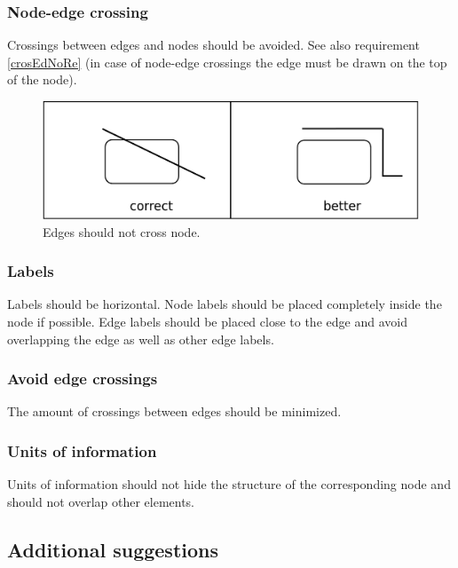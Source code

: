 \subsubsection{Node-edge crossing}\label{crosEdNo}

Crossings between edges and nodes should be avoided. See also requirement \ref{crosEdNoRe} (in case of node-edge crossings the edge must be drawn on the top of the node).

\begin{figure}[!htb]
  \centering
  \includegraphics[scale=0.3]{images/layout-node-edge-2}
  \caption{Edges should not cross node.}\label{fig:layout7}
\end{figure}


\subsubsection{Labels}

Labels should be horizontal. Node labels should be placed completely inside the node if possible. Edge labels should be placed close to the edge and avoid overlapping the edge as well as other edge labels.

\subsubsection{Avoid edge crossings}

The amount of crossings between edges should be minimized.

\subsubsection{Units of information}

Units of information should not hide the structure of the corresponding node and should not overlap other elements.

\subsection{Additional suggestions}

